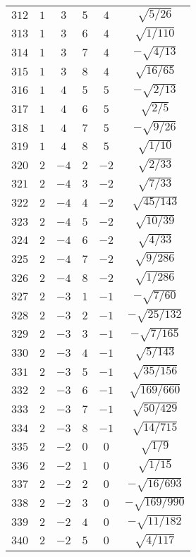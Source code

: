 \begin{table}
\begin{center}
\begin{tabular}{|c|c|c|c|c|c|}
$312$ & $1$ & $3$ & $5$ & $4$ & $\sqrt{5/26}$ \\ 
$313$ & $1$ & $3$ & $6$ & $4$ & $\sqrt{1/110}$ \\ 
$314$ & $1$ & $3$ & $7$ & $4$ & $-\sqrt{4/13}$ \\ 
$315$ & $1$ & $3$ & $8$ & $4$ & $\sqrt{16/65}$ \\ 
$316$ & $1$ & $4$ & $5$ & $5$ & $-\sqrt{2/13}$ \\ 
$317$ & $1$ & $4$ & $6$ & $5$ & $\sqrt{2/5}$ \\ 
$318$ & $1$ & $4$ & $7$ & $5$ & $-\sqrt{9/26}$ \\ 
$319$ & $1$ & $4$ & $8$ & $5$ & $\sqrt{1/10}$ \\ 
$320$ & $2$ & $-4$ & $2$ & $-2$ & $\sqrt{2/33}$ \\ 
$321$ & $2$ & $-4$ & $3$ & $-2$ & $\sqrt{7/33}$ \\ 
$322$ & $2$ & $-4$ & $4$ & $-2$ & $\sqrt{45/143}$ \\ 
$323$ & $2$ & $-4$ & $5$ & $-2$ & $\sqrt{10/39}$ \\ 
$324$ & $2$ & $-4$ & $6$ & $-2$ & $\sqrt{4/33}$ \\ 
$325$ & $2$ & $-4$ & $7$ & $-2$ & $\sqrt{9/286}$ \\ 
$326$ & $2$ & $-4$ & $8$ & $-2$ & $\sqrt{1/286}$ \\ 
$327$ & $2$ & $-3$ & $1$ & $-1$ & $-\sqrt{7/60}$ \\ 
$328$ & $2$ & $-3$ & $2$ & $-1$ & $-\sqrt{25/132}$ \\ 
$329$ & $2$ & $-3$ & $3$ & $-1$ & $-\sqrt{7/165}$ \\ 
$330$ & $2$ & $-3$ & $4$ & $-1$ & $\sqrt{5/143}$ \\ 
$331$ & $2$ & $-3$ & $5$ & $-1$ & $\sqrt{35/156}$ \\ 
$332$ & $2$ & $-3$ & $6$ & $-1$ & $\sqrt{169/660}$ \\ 
$333$ & $2$ & $-3$ & $7$ & $-1$ & $\sqrt{50/429}$ \\ 
$334$ & $2$ & $-3$ & $8$ & $-1$ & $\sqrt{14/715}$ \\ 
$335$ & $2$ & $-2$ & $0$ & $0$ & $\sqrt{1/9}$ \\ 
$336$ & $2$ & $-2$ & $1$ & $0$ & $\sqrt{1/15}$ \\ 
$337$ & $2$ & $-2$ & $2$ & $0$ & $-\sqrt{16/693}$ \\ 
$338$ & $2$ & $-2$ & $3$ & $0$ & $-\sqrt{169/990}$ \\ 
$339$ & $2$ & $-2$ & $4$ & $0$ & $-\sqrt{11/182}$ \\ 
$340$ & $2$ & $-2$ & $5$ & $0$ & $\sqrt{4/117}$ \\ 

\end{tabular}
\end{center}
\end{table}
